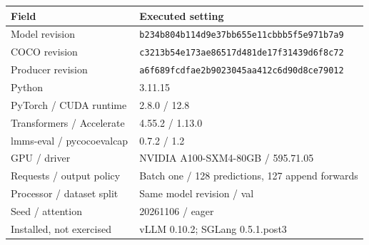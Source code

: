 \begin{tabular}{lp{0.64\linewidth}}
\toprule
Field & Executed setting\\
\midrule
Model revision & \nolinkurl{b234b804b114d9e37bb655e11cbbb5f5e971b7a9}\\
COCO revision & \nolinkurl{c3213b54e173ae86517d481de17f31439d6f8c72}\\
Producer revision & \nolinkurl{a6f689fcdfae2b9023045aa412c6d90d8ce79012}\\
Python & 3.11.15\\
PyTorch / CUDA runtime & 2.8.0 / 12.8\\
Transformers / Accelerate & 4.55.2 / 1.13.0\\
lmms-eval / pycocoevalcap & 0.7.2 / 1.2\\
GPU / driver & NVIDIA A100-SXM4-80GB / 595.71.05\\
Requests / output policy & Batch one / 128 predictions, 127 append forwards\\
Processor / dataset split & Same model revision / val\\
Seed / attention & 20261106 / eager\\
Installed, not exercised & vLLM 0.10.2; SGLang 0.5.1.post3\\
\bottomrule
\end{tabular}
